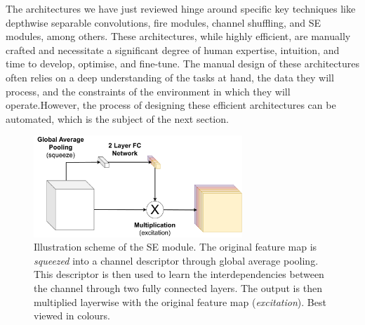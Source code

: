 The architectures we have just reviewed hinge around specific key techniques
like depthwise separable convolutions, fire modules, channel shuffling, and
\ac{SE} modules, among others. These architectures, while
highly efficient, are manually crafted and necessitate a significant degree of
human expertise, intuition, and time to develop, optimise, and fine-tune. The
manual design of these architectures often relies on a deep understanding of the
tasks at hand, the data they will process, and the constraints of the
environment in which they will operate.However, the process of designing these efficient architectures can be
automated, which is the subject of the next section.\\


\begin{figure}[htbp]
    \centering
    \includegraphics[width=0.70\textwidth]{chapter_sota/assets/SE_module.pdf}
    \caption{Illustration scheme of the \acf{SE} module. The original feature
    map is \emph{squeezed} into a channel descriptor through global average
    pooling. This descriptor is then used to learn the interdependencies between
    the channel through two fully connected layers. The output is then
    multiplied layerwise with the original feature map (\emph{excitation}). Best
    viewed in colours.}
    \label{fig:sota:se_module}
\end{figure}

